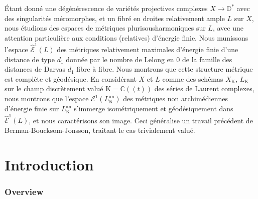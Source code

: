 \documentclass[JEP,XML,SOM,Unicode,NoEqCountersInSection,published]{cedram}
\theoremstyle{definition}
\begin{document}
\begin{altabstract}
Étant donné une dégénérescence de variétés projectives complexes $X\to \mathbb{D}^*$ avec des singularités méromorphes, et un fibré en droites relativement ample $L$ sur $X$, nous étudions des espaces de métriques plurisousharmoniques sur $L$, avec une attention particulière aux conditions (rela\-tives) d'énergie finie. Nous munissons l'espace $\hat {\mathcal{E}}^1(L)$ des métriques relativement maximales d'énergie finie d'une distance de type $d_1$ donnée par le nombre de Lelong en $0$ de la famille des distances de Darvas $d_1$ fibre à fibre. Nous montrons que cette structure métrique est complète et géodésique. En considérant $X$ et $L$ comme des schémas $X_{\mathrm{K}}$, $L_{\mathrm{K}}$ sur le champ discrètement valué $\mathrm{K}=\mathbb{C}(\!(t)\!)$ des séries de Laurent complexes, nous montrons que l'espace $\mathcal{E}^1(L_{\mathrm{K}}^{\mathrm{an}})$ des métriques non archimédiennes d'énergie finie sur $L_{\mathrm{K}}^{\mathrm{an}}$ s'immerge isométriquement et géodésiquement dans $\hat {\mathcal{E}}^1(L)$, et nous caractérisons son image. Ceci généralise un travail précédent de Berman-Boucksom-Jonsson, traitant le cas trivialement valué.
\end{altabstract}

\maketitle
\tableofcontents
\mainmatter

\section*{Introduction}

\subsubsection*{Overview}
\end{document}
